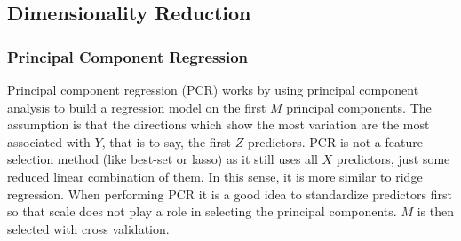 \subsection{Dimensionality Reduction}

\subsubsection{Principal Component Regression}

Principal component regression (PCR) works by using principal component analysis to build a regression model on the first $M$ principal components. The assumption is that the directions which show the most variation are the most associated with $Y$, that is to say, the first $Z$ predictors. PCR is not a feature selection method (like best-set or lasso) as it still uses all $X$ predictors, just some reduced linear combination of them. In this sense, it is more similar to ridge regression. When performing PCR it is a good idea to standardize predictors first so that scale does not play a role in selecting the principal components. $M$ is then selected with cross validation.
